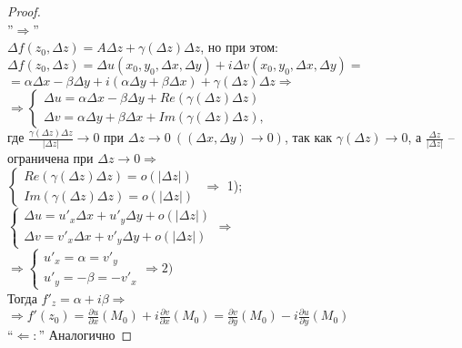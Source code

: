 \begin{proof}
\ \\
''$\Rightarrow$''\\
$\Delta f(z_0, \Delta z) = A\Delta z + \gamma(\Delta z)\Delta z$, но при этом:\\
$\Delta f(z_0, \Delta z) = \Delta u(x_0, y_0, \Delta x, \Delta y) + i\Delta v(x_0, y_0, \Delta x, \Delta y) =$\\[2mm]
$ = \alpha\Delta x - \beta\Delta y + i(\alpha\Delta y + \beta\Delta x) + \gamma(\Delta z)\Delta z \Rightarrow$\\[2mm]
$\Rightarrow
\begin{cases}
    \Delta u = \alpha\Delta x - \beta\Delta y + Re(\gamma(\Delta z)\Delta z)\\
    \Delta v = \alpha\Delta y + \beta\Delta x + Im(\gamma(\Delta z)\Delta z),
\end{cases}$\\
где $\frac{\gamma(\Delta z)\Delta z}{|\Delta z|} \rightarrow 0$ при $\Delta z \rightarrow 0 \ ((\Delta x, \Delta y) \rightarrow 0)$, так как $\gamma(\Delta z) \rightarrow 0$, а $\frac{\Delta z}{|\Delta z|}$ -- ограничена при $\Delta z \rightarrow 0 \Rightarrow$\\
$\begin{cases}
    Re(\gamma(\Delta z)\Delta z) = o(|\Delta z|)\\
    Im(\gamma(\Delta z)\Delta z) = o(|\Delta z|)
\end{cases}$
$\Rightarrow$ 1);\\
$\begin{cases}
    \Delta u = u'_x\Delta x + u'_y\Delta y + o(|\Delta z|)\\
    \Delta v = v'_x\Delta x + v'_y\Delta y + o(|\Delta z|)
\end{cases} \Rightarrow$\\
$\Rightarrow
\begin{cases}
    u'_x = \alpha = v'_y\\
    u'_y = -\beta = -v'_x
\end{cases} \Rightarrow 2)$\\
Тогда $f'_z = \alpha + i\beta \Rightarrow$
$\Rightarrow f'(z_0) = \frac{\partial u}{\partial x} (M_0) + i\frac{\partial v}{\partial x} (M_0) = \frac{\partial v}{\partial y} (M_0) - i\frac{\partial u}{\partial y} (M_0)$\\[2mm]
``$\Leftarrow:$''
Аналогично
\end{proof}

